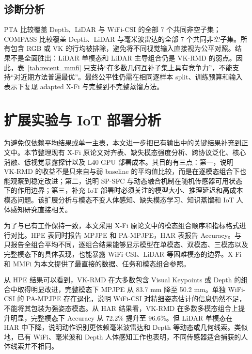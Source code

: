 \documentclass[journal]{IEEEtran}
\newcommand{\parahead}[1]{\vspace{0.4em}\noindent{\textbf{#1}}}
\begin{document}
\subsection{诊断分析}

PTA 比较覆盖 Depth、LiDAR 与 WiFi-CSI 的全部 7 个共同非空子集；COMPASS 比较覆盖 Depth、LiDAR 与毫米波雷达的全部 7 个共同非空子集。所有包含 RGB 或 VK 的行均被排除，避免将不同视觉输入直接视为公平对照。结果不是全面胜出：LiDAR 单模态和 LiDAR 主导组合仍是 VK-RMD 的弱点。因此，表~\ref{tab:recent_mmfi} 只支持“在多数几何互补子集上具有竞争力”，不能支持“对近期方法普遍最优”。最终公平性仍需在相同逐样本 split、训练预算和输入表示下复现 adapted X-Fi 与完整到不完整蒸馏方法。


\section{扩展实验与 IoT 部署分析}

为避免仅依赖平均结果或单一主表，本文进一步把已有输出中的关键结果补充到正文中。本节整理现有 X-Fi 原论文对齐表、缺失模态强度分析、跨协议泛化、核心消融、低视觉暴露探针以及 L40 GPU 部署成本。其目的有三点：第一，说明 VK-RMD 的收益不是只来自与弱 baseline 的平均值比较，而是在逐模态组合下也能观察到稳定改进；第二，说明 SP-SFC 与动态融合机制在随机传感器可用状态下的作用边界；第三，补充 IoT 部署时必须关注的模型大小、推理延迟和高成本模态问题。该扩展分析与模态不变人体感知、缺失模态学习、知识蒸馏和 IoT 人体感知研究直接相关\cite{xfi,mmfi,missingSurvey,goodPracticeMissing,moddrop,kd,fitnets,lupi,iotSurvey,smartHealthcare}。

\parahead{与 X-Fi 原论文的逐组合对齐比较。}
为了与已有工作保持一致，本文采用 X-Fi 原论文中的模态组合顺序和指标格式进行对比。HPE 表同时报告 MPJPE 和 PA-MPJPE，HAR 表报告 Accuracy。与只报告全组合平均不同，逐组合结果能够显示模型在单模态、双模态、三模态以及完整模态下的具体表现，也能暴露 WiFi-CSI、LiDAR 等困难模态的边界。X-Fi 和 MMFi 为本文提供了最直接的数据、任务和模态组合参照\cite{xfi,mmfi}。




从 HPE 结果可以看到，VK-RMD 在大多数包含 Visual Keypoints 或 Depth 的组合中取得明显改进，完整模态下 MPJPE 从 83.7 mm 降至 50.2 mm。单独 WiFi-CSI 的 PA-MPJPE 存在退化，说明 WiFi-CSI 对精细姿态估计的信息仍然不足，不能将其包装为强姿态模态。从 HAR 结果看，VK-RMD 在多数多模态组合上提升明显，完整模态下 Accuracy 从 72.2\% 提升至 96.6\%。但 LiDAR 单模态在 HAR 中下降，说明动作识别更依赖毫米波雷达和 Depth 等动态或几何线索。类似地，已有 WiFi、毫米波和 Depth 人体感知工作也表明，不同传感器适合捕获的人体线索并不相同\cite{metafi,virteach,adapose,robustwifi,wifiSurvey,shotton2011}。
\end{document}
